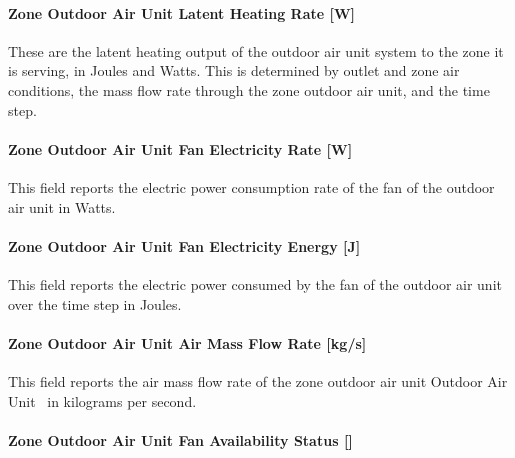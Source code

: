 \paragraph{Zone Outdoor Air Unit Latent Heating Rate {[}W{]}}\label{zone-outdoor-air-unit-latent-heating-rate-w}

These are the latent heating output of the outdoor air unit system to the zone it is serving, in Joules and Watts. This is determined by outlet and zone air conditions, the mass flow rate through the zone outdoor air unit, and the time step.

\paragraph{Zone Outdoor Air Unit Fan Electricity Rate {[}W{]}}\label{zone-outdoor-air-unit-fan-electric-power-w}

This field reports the electric power consumption rate of the fan of the outdoor air unit in Watts.

\paragraph{Zone Outdoor Air Unit Fan Electricity Energy {[}J{]}}\label{zone-outdoor-air-unit-fan-electric-energy-j}

This field reports the electric power consumed by the fan of the outdoor air unit over the time step in Joules.

\paragraph{Zone Outdoor Air Unit Air Mass Flow Rate {[}kg/s{]}}\label{zone-outdoor-air-unit-air-mass-flow-rate-kgs}

This field reports the air mass flow rate of the zone outdoor air unit Outdoor Air Unit~ in kilograms per second.

\paragraph{Zone Outdoor Air Unit Fan Availability Status {[]}}\label{zone-outdoor-air-unit-fan-availability-status}

